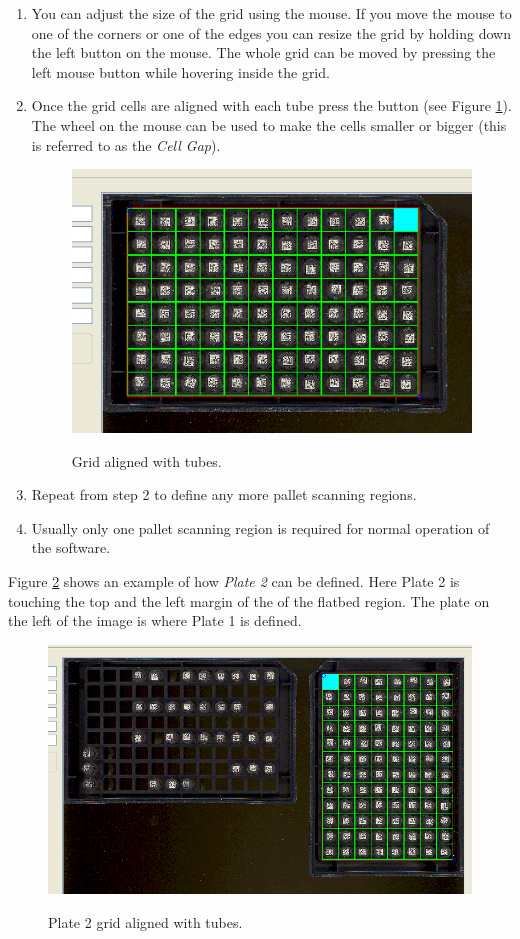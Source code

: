 \begin{enumerate}
  \item You can adjust the size of the grid using the mouse. If you move the
    mouse to one of the corners or one of the edges you can resize the grid by
    holding down the left button on the mouse. The whole grid can be moved by
    pressing the left mouse button while hovering inside the grid.
  \item Once the grid cells are aligned with each tube press the  button
    (see Figure \ref{fig:plate1_grid_ready}). The wheel on the mouse can be
    used to make the cells smaller or bigger (this is referred to as the
    \emph{Cell Gap}).
    \begin{figure}[H]
      \centering
      \scalebox{0.5}
      { \includegraphics*{screenshots/configuration/plate1_grid_ready} }
      \caption{Grid aligned with tubes.}
      \label{fig:plate1_grid_ready}
    \end{figure}
  \item Repeat from step 2 to define any more pallet scanning regions.
  \item Usually only one pallet scanning region is required for normal
    operation of the software.
\end{enumerate}
Figure \ref{fig:plate2_grid_ready} shows an example of how \emph{Plate 2} can
be defined. Here Plate 2 is touching the top and the left margin of
the of the flatbed region. The plate on the left of the image is where Plate 1
is defined.
    \begin{figure}[H]
      \centering
      \scalebox{0.5}
      { \includegraphics*{screenshots/configuration/plate2_grid_ready} }
      \caption{Plate 2 grid aligned with tubes.}
      \label{fig:plate2_grid_ready}
    \end{figure}

